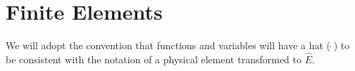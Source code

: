 \chapter{Finite Elements}\label{aux_label43}
We will adopt the convention that functions and variables 
will have a hat ($\,\hat{}\,$) to be consistent with the notation
of a physical element transformed to $\hat E$.




